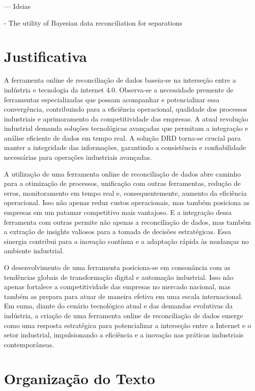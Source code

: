 --- Ideias 

- The utility of Bayesian data reconciliation for separations


\section{Justificativa}

A ferramenta online de reconciliação de dados baseia-se na interseção entre a indústria e tecnologia da internet 4.0. Observa-se a necessidade premente de ferramentas especializadas que possam acompanhar e potencializar essa convergência, contribuindo para a eficiência operacional, qualidade dos processos industriais e aprimoramento da competitividade das empresas. A atual revolução industrial demanda soluções tecnológicas avançadas que permitam a integração e análise eficiente de dados em tempo real. A solução DRD torna-se crucial para manter a integridade das informações, garantindo a consistência e confiabilidade necessárias para operações industriais avançadas.

A utilização de uma ferramenta online de reconciliação de dados abre caminho para a otimização de processos, unificação com outras ferramentas, redução de erros, monitoramento em tempo real e, consequentemente, aumento da eficiência operacional. Isso não apenas reduz custos operacionais, mas também posiciona as empresas em um patamar competitivo mais vantajoso. E a integração dessa ferramenta com outras permite não apenas a reconciliação de dados, mas também a extração de insights valiosos para a tomada de decisões estratégicas. Essa sinergia contribui para a inovação contínua e a adaptação rápida às mudanças no ambiente industrial.

O desenvolvimento de uma ferramenta posiciona-se em consonância com as tendências globais de transformação digital e automação industrial. Isso não apenas fortalece a competitividade das empresas no mercado nacional, mas também as prepara para atuar de maneira efetiva em uma escala internacional. Em suma, diante do cenário tecnológico atual e das demandas evolutivas da indústria, a criação de uma ferramenta online de reconciliação de dados emerge como uma resposta estratégica para potencializar a interseção entre a Internet e o setor industrial, impulsionando a eficiência e a inovação nas práticas industriais contemporâneas.

\section{Organização do Texto}

